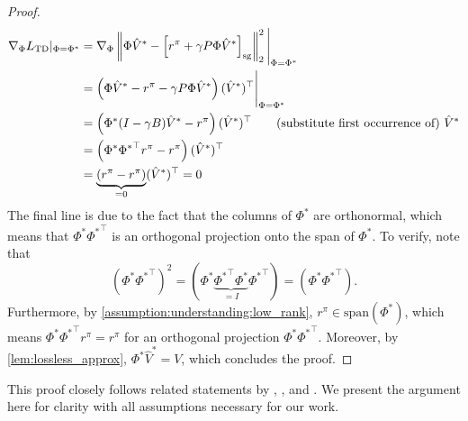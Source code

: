 \begin{proof}
    \begin{align*}
        \nabla_\Phi L_\text{TD}|_{\Phi = \Phi^*} & =  \nabla_{\Phi} \left\lVert \Phi \hat{V}^* - \left[r^\pi + \gamma P\Phi \hat{V}^*\right]_\text{sg} \right\rVert_2^2\Bigg|_{\Phi = \Phi^*}\\
        & = \left(\Phi \hat{V}^* - r^\pi - \gamma P\Phi {\hat{V}}^*\right) (\hat{V}^*)^\top\Bigg|_{\Phi = \Phi^*} \\
        & = \left(\Phi^* (I - \gamma B) {\hat{V}}^* - r^\pi \right)(\hat{V}^*)^\top \quad\quad \text{(substitute first occurrence of)~$\hat{V}^*$}\\
        & = \left(\Phi^* {\Phi^*}^\top r^\pi - r^\pi \right)({\hat{V}}^*)^\top\\
        & = \underbrace{\left(r^\pi - r^\pi \right)}_{=0}({\hat{V}}^*)^\top = 0
    \end{align*}
    The final line is due to the fact that the columns of $\Phi^*$ are orthonormal, which means that $\Phi^*{\Phi^*}^\top$ is an orthogonal projection onto the span of $\Phi^*$. To verify, note that $$\left(\Phi^*{\Phi^*}^\top\right)^2 = \left(\Phi^* \underbrace{{\Phi^*}^\top \Phi^*}_{=I}{\Phi^*}^\top\right) = \left(\Phi^*{\Phi^*}^\top\right).$$ Furthermore, by \autoref{assumption:understanding:low_rank}, $r^\pi \in \text{span}(\Phi^*)$, which means $\Phi^*{\Phi^*}^\top r^\pi = r^\pi$ for an orthogonal projection $\Phi^*{\Phi^*}^\top$.
    Moreover, by \autoref{lem:lossless_approx}, $\Phi^* \hat{V}^* = V$, which concludes the proof.
\end{proof}

This proof closely follows related statements by \cite{ghosh2020representations}, \cite{tang2022understanding}, and \cite{lelan2022generalization}. 
We present the argument here for clarity with all assumptions necessary for our work.


